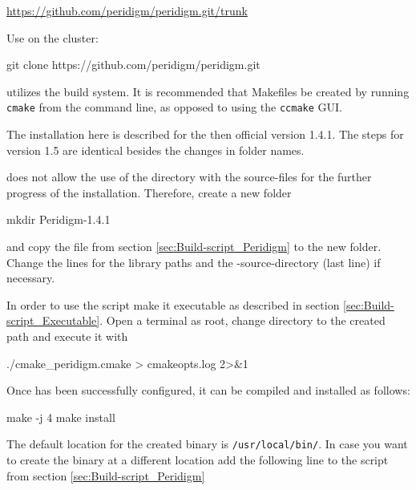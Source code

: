 \href{https://github.com/peridigm/peridigm.git/trunk}{https://github.com/peridigm/peridigm.git/trunk}


Use  on the cluster:

\begingroup
\lstset{breaklines=true}
\begin{code}
git clone https://github.com/peridigm/peridigm.git
\end{code}
\endgroup


\marktool{\toolname} utilizes the \marktool{\cmakename} build system. It is recommended that Makefiles be created by running \verb+cmake+ from the command line, as opposed to using the \verb+ccmake+ GUI.

The installation here is described for the then official \marktool{\toolname} version 1.4.1. The steps for version 1.5 are identical besides the changes in folder names.

\marktool{\toolname} does not allow the use of the directory with the source-files for the further progress of the installation. Therefore, create a new folder

\begin{code}
mkdir Peridigm-1.4.1
\end{code}

and copy the file from section \ref{sec:Build-script_Peridigm} to the new folder. Change the lines for the library paths and the \marktool{\toolnameshort}-source-directory (last line) if necessary.

In order to use the script make it executable as described in section \ref{sec:Build-script_Executable}. Open a terminal as root, change directory to the created path and execute it with

\begin{code}
./cmake_peridigm.cmake > cmakeopts.log 2>&1
\end{code}

Once \marktool{\toolname} has been successfully configured, it can be compiled and installed as follows:

\begin{code}
make -j 4
make install
\end{code}

The default location for the created binary is \verb+/usr/local/bin/+. In case you want to create the binary at a different location add the following line to the script from section \ref{sec:Build-script_Peridigm}

